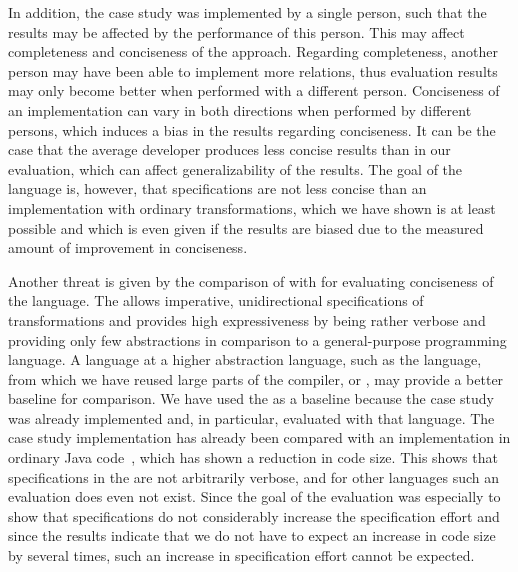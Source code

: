 In addition, the case study was implemented by a single person, such that the results may be affected by the performance of this person.
This may affect completeness and conciseness of the approach.
Regarding completeness, another person may have been able to implement more relations, thus evaluation results may only become better when performed with a different person.
Conciseness of an implementation can vary in both directions when performed by different persons, which induces a bias in the results regarding conciseness.
It can be the case that the average developer produces less concise results than in our evaluation, which can affect generalizability of the results.
The goal of the language is, however, that specifications are not less concise than an implementation with ordinary transformations, which we have shown is at least possible and which is even given if the results are biased due to the measured amount of improvement in conciseness.

Another threat is given by the comparison of \commonalities with \reactions for evaluating conciseness of the language.
The \reactionslanguage allows imperative, unidirectional specifications of transformations and provides high expressiveness by being rather verbose and providing only few abstractions in comparison to a general-purpose programming language.
A language at a higher abstraction language, such as the \mappings language, from which we have reused large parts of the compiler, or \qvtr, may provide a better baseline for comparison.
We have used the \reactionslanguage as a baseline because the case study was already implemented and, in particular, evaluated with that language.
The case study implementation has already been compared with an implementation in ordinary Java code~, which has shown a reduction in code size.
This shows that specifications in the \reactionslanguage are not arbitrarily verbose, and for other languages such an evaluation does even not exist.
Since the goal of the evaluation was especially to show that \commonalities specifications do not considerably increase the specification effort and since the results indicate that we do not have to expect an increase in code size by several times, such an increase in specification effort cannot be expected.

